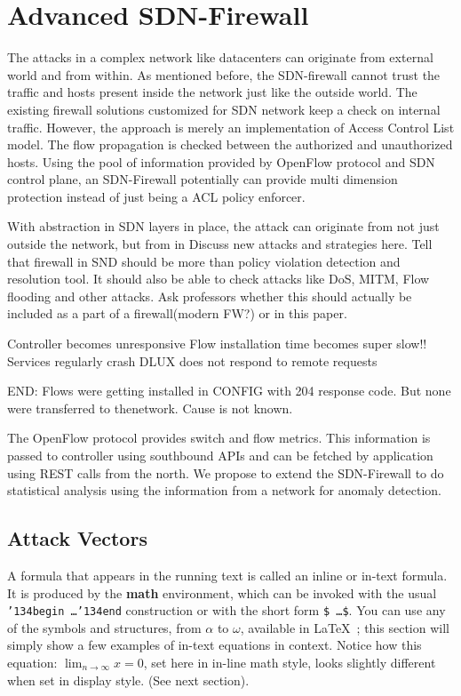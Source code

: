 \section{Advanced SDN-Firewall}
The attacks in a complex network like datacenters can originate from external world and from within. As mentioned before, the SDN-firewall cannot trust the traffic and hosts present inside the network just like the outside world. The existing firewall solutions customized for SDN network keep a check on internal traffic. However, the approach is merely an implementation of Access Control List model. The flow propagation is checked between the authorized and unauthorized hosts. Using the pool of information provided by OpenFlow protocol and SDN control plane, an SDN-Firewall potentially can provide multi dimension protection instead of just being a ACL policy enforcer. 

With abstraction in SDN layers in place, the attack can originate from not just outside the network, but from in
Discuss new attacks and strategies here. Tell that firewall in SND should be more than policy violation detection and resolution tool. It should also be able to check attacks like DoS, MITM, Flow flooding and other attacks. Ask professors whether this should actually be included as a part of a firewall(modern FW?) or in this paper.

Controller becomes unresponsive 
Flow installation time becomes super slow!!
Services regularly crash
DLUX does not respond to remote requests

END:
Flows were getting installed in CONFIG with 204 response code. But none were transferred to thenetwork. Cause is not known.

The OpenFlow protocol provides switch and flow metrics. This information is passed to controller using southbound APIs and can be fetched by application using REST calls from the north. We propose to extend the SDN-Firewall to do statistical analysis using the information from a network for anomaly detection.

\subsection{Attack Vectors}
A formula that appears in the running text is called an
inline or in-text formula.  It is produced by the
\textbf{math} environment, which can be
invoked with the usual \texttt{{\char'134}begin\,\ldots{\char'134}end}
construction or with the short form \texttt{\$\,\ldots\$}. You
can use any of the symbols and structures,
from $\alpha$ to $\omega$, available in
\LaTeX~\cite{Lamport:LaTeX}; this section will simply show a
few examples of in-text equations in context. Notice how
this equation:
\begin{math}
  \lim_{n\rightarrow \infty}x=0
\end{math},
set here in in-line math style, looks slightly different when
set in display style.  (See next section).

